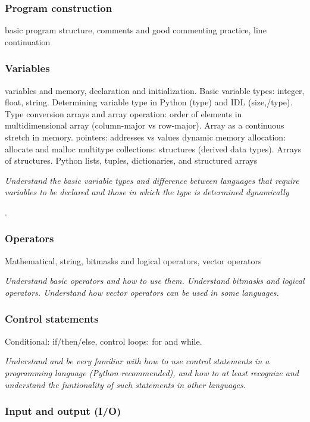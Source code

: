 \documentclass{article}
\newcommand{\test}[1]{%
    \begin{center}
        \colorbox{hl}{\parbox{0.9\textwidth}{\emph{\centering #1}}}
    \end{center}}
\begin{document}
\subsubsection{Program construction}
basic program structure,
comments and good commenting practice,
line continuation
\subsubsection{Variables}
variables and memory, declaration and initialization.
Basic variable types: integer, float, string. Determining variable
type in Python (type) and IDL (size,/type).
Type conversion
arrays and array operation: order of elements in multidimensional
array (column-major vs row-major). Array as a continuous stretch in
memory.
pointers: addresses vs values
dynamic memory allocation: allocate and malloc
multitype collections: structures (derived data types). Arrays of
structures. Python lists, tuples, dictionaries, and structured arrays

\test{Understand the basic variable types and difference between
languages that require variables to be declared and those in which the
type is determined dynamically}.

\subsubsection{Operators}
Mathematical, string, bitmasks and logical operators, vector operators
\test{Understand basic operators and how to use them. Understand
bitmasks and logical operators. Understand how vector operators can be
used in some languages.}
\subsubsection{Control statements}
Conditional: if/then/else, control loops: for and while.

\test{Understand and be very familiar with how to use control
statements in a programming language (Python recommended),
and how to at least recognize and understand the funtionality
of such statements in other languages.}
\subsubsection{Input and output (I/O)}
\end{document}
